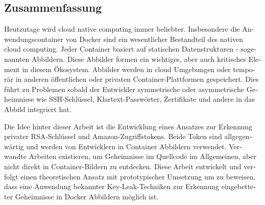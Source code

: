 \begin{otherlanguage}{ngerman}
\chapter*{Zusammenfassung}
Heutzutage wird cloud native computing immer beliebter. Insbesondere die Anwendungscontainer von Docker sind ein wesentlicher Bestandteil des nativen cloud computing. Jeder Container basiert auf statischen Datenstrukturen - sogenannten Abbildern. Diese Abbilder formen ein wichtiges, aber auch kritisches Element in diesem Ökosystem.
Abbilder werden in cloud Umgebungen oder temporär in anderen öffentlichen oder privaten Container-Plattformen gespeichert. Dies führt zu Problemen sobald der Entwickler symmetrische oder asymmetrische Geheimnisse wie SSH-Schlüssel, Klartext-Passwörter, Zertifikate und andere in das Abbild integriert hat.

Die Idee hinter dieser Arbeit ist die Entwicklung eines Ansatzes zur Erkennung privater RSA-Schlüssel und Amazon-Zugriffstokens. 
Beide Token sind allgegenwärtig und werden von Entwicklern in Container Abbildern verwendet. 
Verwandte Arbeiten existieren, um Geheimnisse im Quellcode im Allgemeinen, aber nicht direkt in Container-Bildern zu entdecken. 
Diese Arbeit entwickelt und verfolgt einen theoretischen Ansatz mit prototypischer Umsetzung um zu beweisen, dass eine Anwendung bekannter Key-Leak-Techniken zur Erkennung eingebetteter Geheimnisse in Docker Abbildern möglich ist.
\end{otherlanguage}

